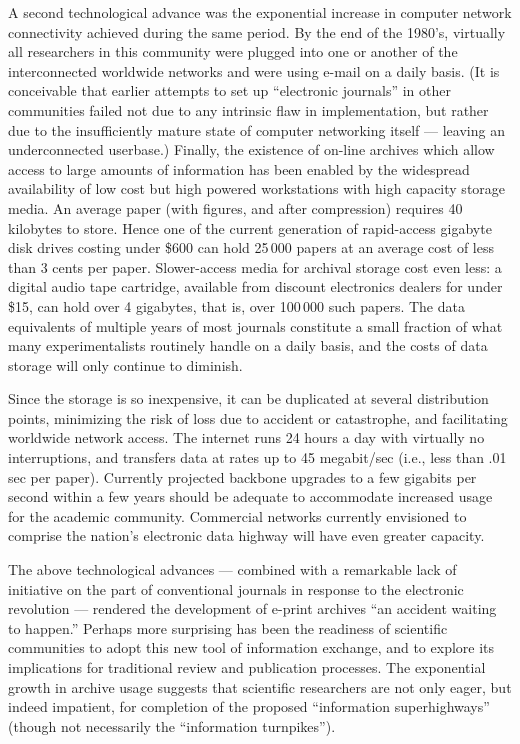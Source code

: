 A second technological advance was the exponential increase in computer network
connectivity achieved during the same period. By the end of the 1980's,
virtually all researchers in this community were plugged into one or another of
the interconnected worldwide networks and were using e-mail on a daily basis.
(It is conceivable that earlier attempts to set up ``electronic journals'' in
other communities failed not due to any intrinsic flaw in implementation,
but rather due to the insufficiently mature state of
computer networking itself --- leaving an underconnected userbase.)
Finally, the existence of on-line archives which allow access to large amounts
of information has been enabled by the widespread availability of low cost but
high powered workstations with high capacity storage media. An average paper
(with figures, and after compression) requires 40 kilobytes to store.
Hence one of the current generation of rapid-access gigabyte disk drives
costing under \$600 can hold 25$\,$000 papers at an average cost of less
than 3 cents per paper.
Slower-access media for archival storage cost even less: a digital
audio tape cartridge, available from discount electronics dealers for under
\$15, can hold over 4 gigabytes, that is, over 100$\,$000 such papers. The data
equivalents of multiple years of most journals constitute a small fraction of
what many experimentalists routinely handle on a daily basis, and the costs of
data storage will only continue to diminish.

Since the storage is so inexpensive, it can be duplicated at several
distribution points, minimizing the risk of loss due to accident or
catastrophe, and facilitating worldwide network access. The internet runs 24
hours a day with virtually no interruptions, and transfers data at rates up to
45 megabit/sec (i.e., less than .01 sec per paper).
Currently projected backbone upgrades to a few gigabits per second within a
few years should be adequate to accommodate increased usage for the academic
community. Commercial networks currently envisioned to comprise the nation's
electronic data highway will have even greater capacity.

The above technological advances --- combined with a remarkable lack of
initiative on the part of conventional journals in response to
the electronic revolution --- rendered the
development of e-print archives ``an accident waiting to happen.''
Perhaps more surprising has been the readiness of scientific communities to
adopt this new tool of information exchange, and to explore its implications
for traditional review and publication processes. The exponential growth in
archive usage suggests that scientific researchers are not only eager, but
indeed impatient, for completion of the proposed ``information
superhighways'' (though not necessarily the ``information turnpikes'').


